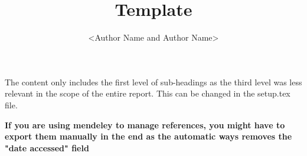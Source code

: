 \documentclass[12pt]{article}
\title{Template}
\author{<Author Name and Author Name>}
\begin{document}



\newpage
{}



\customtoc

The content only includes the first level of sub-headings as the third level was less relevant in the scope of the entire report. This can be changed in the setup.tex file.









% 

\newpage
{}
\textbf{If you are using mendeley to manage references, you might have to export them manually in the end as the automatic ways removes the "date accessed" field}
\printbibliography




\end{document}
